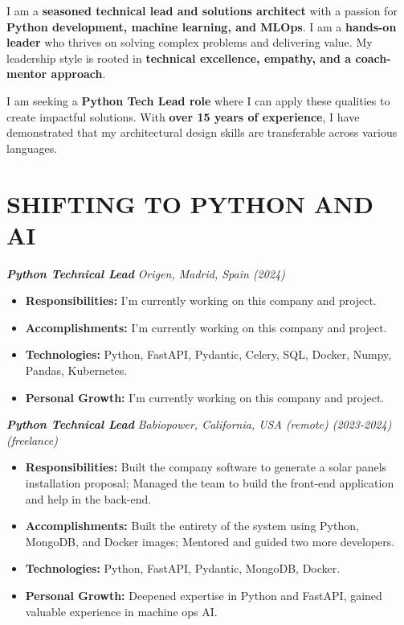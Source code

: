 \documentclass[a4paper,10pt]{article}
\begin{document}
\noindent
\begin{minipage}[t]{0.65\textwidth}
\begin{minipage}[t]{\dimexpr\linewidth-25px}
\justifying

I am a \textbf{seasoned technical lead and solutions architect} with a passion for \textbf{Python development, machine learning, and MLOps}. I am a \textbf{hands-on leader} who thrives on solving complex problems and delivering value. My leadership style is rooted in \textbf{technical excellence, empathy, and a coach-mentor approach}.

\vspace{0.5cm}

I am seeking a \textbf{Python Tech Lead role} where I can apply these qualities to create impactful solutions. With \textbf{over 15 years of experience}, I have demonstrated that my architectural design skills are transferable across various languages.

    \section*{\large SHIFTING TO PYTHON AND AI}
    \textbf{\textit{Python Technical Lead}}
    \textit{\small Origen, Madrid, Spain (2024)}
    \vspace{0.3cm}
    \begin{itemize}[leftmargin=*]
        \item \textbf{Responsibilities:} I'm currently working on this company and project.
        \item \textbf{Accomplishments:} I'm currently working on this company and project.
        \item \textbf{Technologies:} Python, FastAPI, Pydantic, Celery, SQL, Docker, Numpy, Pandas, Kubernetes.
        \item \textbf{Personal Growth:} I'm currently working on this company and project.
    \end{itemize}

    \vspace{1cm}

    \textbf{\textit{Python Technical Lead}}
    \textit{\small Babiopower, California, USA (remote) (2023-2024) (freelance)}
    \vspace{0.3cm}
    \begin{itemize}[leftmargin=*]
        \item \textbf{Responsibilities:} Built the company software to generate a solar panels installation proposal;
    Managed the team to build the front-end application and help in the back-end.
        \item \textbf{Accomplishments:} Built the entirety of the system using Python, MongoDB, and Docker images;
    Mentored and guided two more developers.
        \item \textbf{Technologies:} Python, FastAPI, Pydantic, MongoDB, Docker.
        \item \textbf{Personal Growth:} Deepened expertise in Python and FastAPI, gained valuable experience in machine ops AI.
    \end{itemize}


\end{minipage}
\end{minipage}
\end{document}
